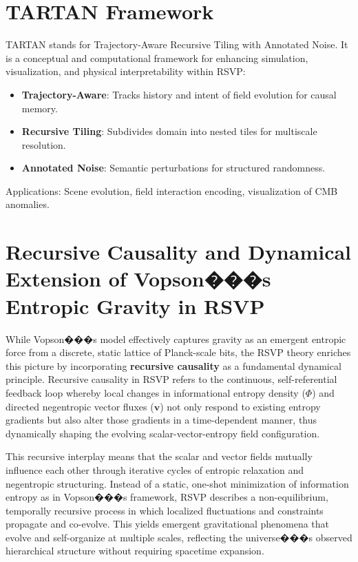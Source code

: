 \documentclass[11pt]{article}
\theoremstyle{plain}
\theoremstyle{definition}
\begin{document}
\section{TARTAN Framework}
TARTAN stands for Trajectory-Aware Recursive Tiling with Annotated Noise. It is a conceptual and computational framework for enhancing simulation, visualization, and physical interpretability within RSVP: 
\begin{itemize}
    \item \textbf{Trajectory-Aware}: Tracks history and intent of field evolution for causal memory.
    \item \textbf{Recursive Tiling}: Subdivides domain into nested tiles for multiscale resolution.
    \item \textbf{Annotated Noise}: Semantic perturbations for structured randomness.
\end{itemize}
Applications: Scene evolution, field interaction encoding, visualization of CMB anomalies.

\section{Recursive Causality and Dynamical Extension of Vopson���s Entropic Gravity in RSVP}
While Vopson���s model effectively captures gravity as an emergent entropic force from a discrete, static lattice of Planck-scale bits, the RSVP theory enriches this picture by incorporating \textbf{recursive causality} as a fundamental dynamical principle. Recursive causality in RSVP refers to the continuous, self-referential feedback loop whereby local changes in informational entropy density ($\Phi$) and directed negentropic vector fluxes ($\mathbf{v}$) not only respond to existing entropy gradients but also alter those gradients in a time-dependent manner, thus dynamically shaping the evolving scalar-vector-entropy field configuration.

This recursive interplay means that the scalar and vector fields mutually influence each other through iterative cycles of entropic relaxation and negentropic structuring. Instead of a static, one-shot minimization of information entropy as in Vopson���s framework, RSVP describes a non-equilibrium, temporally recursive process in which localized fluctuations and constraints propagate and co-evolve. This yields emergent gravitational phenomena that evolve and self-organize at multiple scales, reflecting the universe���s observed hierarchical structure without requiring spacetime expansion.
\end{document}
